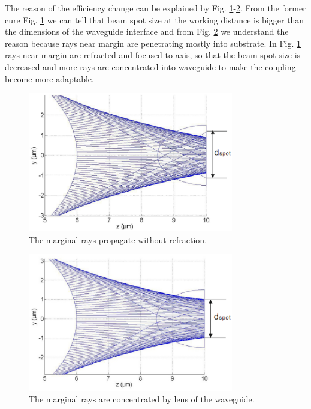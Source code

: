 The reason of the efficiency change can be explained by Fig.  \ref{fig:matlab_coupling_lenses_rxx}-\ref{fig:matlab_coupling_lenses_rxx2}. From the former cure Fig. \ref{fig:matlab_coupling_lenses_rxx} we can tell that beam spot size at the working distance is bigger than the dimensions of the waveguide interface and from Fig. \ref{fig:matlab_coupling_lenses_rxx2} we understand the reason because rays near margin are penetrating mostly into substrate. In Fig. \ref{fig:matlab_coupling_lenses_rxx} rays near margin are refracted and focused to axis, so that the beam spot size is decreased and more rays are concentrated into waveguide to make the coupling become more adaptable.   
\begin{figure}[!ht]
\centering
\includegraphics[width=0.8\textwidth]{bilder/beam_ray_without_refract}
\caption{The marginal rays propagate without refraction.}
\label{fig:matlab_coupling_lenses_rxx}
\end{figure}
\begin{figure}[!ht]
\centering
\includegraphics[width=0.8\textwidth]{bilder/beam_ray_refract}
\caption{The marginal rays are concentrated by lens of the waveguide.}
\label{fig:matlab_coupling_lenses_rxx2}
\end{figure}
